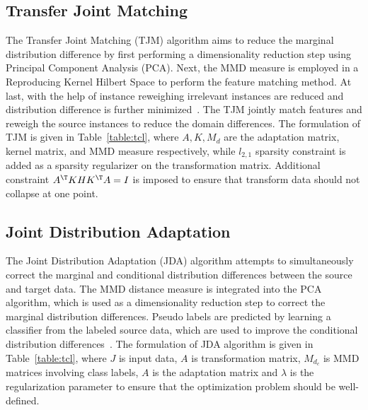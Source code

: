 \subsection{Transfer Joint Matching}
The Transfer Joint Matching (TJM) algorithm aims to reduce the marginal distribution difference by first performing a dimensionality reduction step using Principal Component Analysis (PCA). Next, the MMD measure is employed in a Reproducing Kernel Hilbert Space to perform the feature matching method. At last, with the help of instance reweighing irrelevant instances are reduced and distribution difference is further minimized~\cite{6751384}.
The TJM jointly match features and reweigh the source instances to reduce the domain differences. The formulation of TJM is given in Table~\ref{table:tcl}, where ${A, K, M_d}$ are the adaptation matrix, kernel matrix, and MMD measure respectively, while $l_{2,1}$ sparsity constraint is added as a sparsity regularizer on the transformation matrix. Additional constraint $A^\T KHK^\T A = I$ is imposed to ensure that transform data should not collapse at one point.
\subsection{Joint Distribution Adaptation}
The Joint Distribution Adaptation (JDA) algorithm attempts to simultaneously correct the marginal and conditional distribution differences between the source and target data. The MMD distance measure is integrated into the PCA algorithm, which is used as a dimensionality reduction step to correct the marginal distribution differences. Pseudo labels are predicted by learning a classifier from the labeled source data, which are used to improve the conditional distribution differences~\cite{6751384}. The formulation of JDA algorithm is given in Table~\ref{table:tcl}, where $J$ is input data, $A$ is transformation matrix, $M_{d_c}$ is MMD matrices involving class labels, $A$ is the adaptation matrix and $\lambda$ is the regularization parameter to ensure that the optimization problem should be well-defined. 
